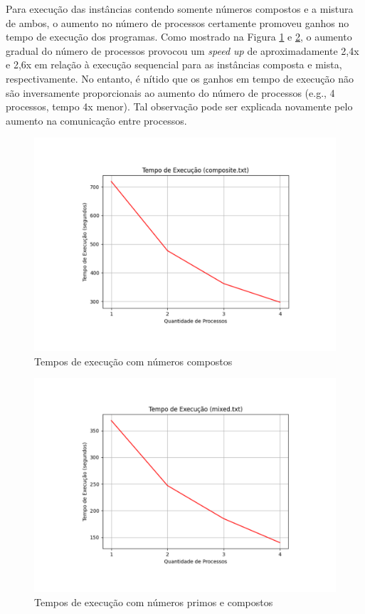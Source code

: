 \documentclass[a4paper, 12pt]{article}
\begin{document}
Para execução das instâncias contendo somente números compostos e a mistura de ambos, o aumento no número de processos certamente promoveu ganhos no tempo de execução dos programas. Como mostrado na Figura \ref{fig:map3} e \ref{fig:map4}, o aumento gradual do número de processos provocou um \emph{speed up} de aproximadamente 2,4x e 2,6x em relação à execução sequencial para as instâncias composta e mista, respectivamente. No entanto, é nítido que os ganhos em tempo de execução não são inversamente proporcionais ao aumento do número de processos (e.g., 4 processos, tempo 4x menor). Tal observação pode ser explicada novamente pelo aumento na comunicação entre processos.

\begin{figure}[H]
    \centering
    \includegraphics[width=1.1\textwidth]{Images/composite.pdf}
    \vspace*{-1.5cm}
    \caption{Tempos de execução com números compostos}
    \label{fig:map3}
\end{figure}

\vspace*{-1.8cm}
\begin{figure}[H]
    \centering
    \includegraphics[width=1.1\textwidth]{Images/mixed.pdf}
    \vspace*{-1.5cm}
    \caption{Tempos de execução com números primos e compostos}
    \label{fig:map4}
\end{figure}
\end{document}
